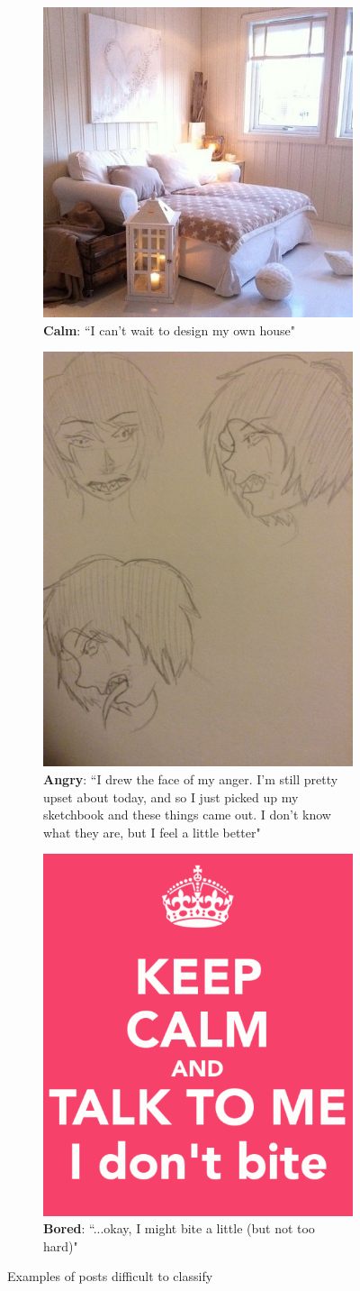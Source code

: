 \documentclass{article} %
\begin{document}
\begin{figure}[H]
    \begin{subfigure}[t]{.5\textwidth}
        \vskip 0pt %
        \centering
        \includegraphics[width=.3\linewidth]{Images/outlier1.jpg}
        \caption{\textbf{Calm}: ``I can't wait to design my own house"}
        \label{outlier1}
   \end{subfigure}
   \begin{subfigure}[t]{.5\textwidth}
       \vskip 0pt
       \centering
       \includegraphics[width=.3\linewidth]{Images/outlier3.jpg}
       \caption{\textbf{Angry}: ``I drew the face of my anger. I'm still pretty upset about today, and so I just picked up my sketchbook and these things came out. I don't know what they are, but I feel a little better"}
       \label{outlier2}
    \end{subfigure}
    \begin{subfigure}[t]{.5\textwidth}
       \vskip 0pt
       \centering
       \includegraphics[width=.3\linewidth]{Images/outlier2.png}
       \caption{\textbf{Bored}: ``...okay, I might bite a little (but not too hard)"}
       \label{outlier3}
    \end{subfigure}
    \caption{Examples of posts difficult to classify}
    \label{fig:outliers}
\end{figure}
\end{document}
